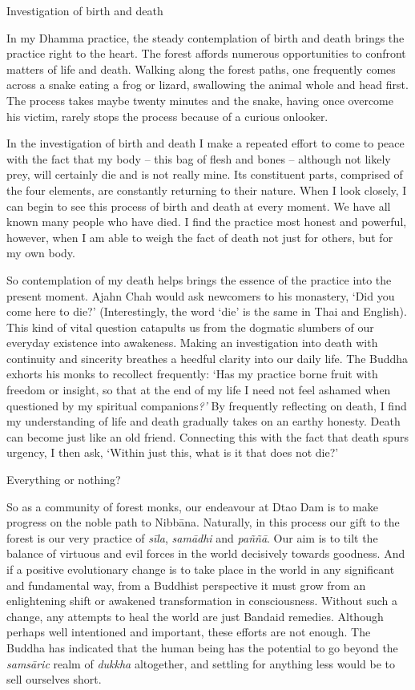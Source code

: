 Investigation of birth and death

In my Dhamma practice, the steady contemplation of birth and death
brings the practice right to the heart. The forest affords numerous
opportunities to confront matters of life and death. Walking along the
forest paths, one frequently comes across a snake eating a frog or
lizard, swallowing the animal whole and head first. The process takes
maybe twenty minutes and the snake, having once overcome his victim,
rarely stops the process because of a curious onlooker.

In the investigation of birth and death I make a repeated effort to come
to peace with the fact that my body -- this bag of flesh and bones --
although not likely prey, will certainly die and is not really mine. Its
constituent parts, comprised of the four elements, are constantly
returning to their nature. When I look closely, I can begin to see this
process of birth and death at every moment. We have all known many
people who have died. I find the practice most honest and powerful,
however, when I am able to weigh the fact of death not just for others,
but for my own body.

So contemplation of my death helps brings the essence of the practice
into the present moment. Ajahn Chah would ask newcomers to his
monastery, `Did you come here to die?' (Interestingly, the word `die' is
the same in Thai and English). This kind of vital question catapults us
from the dogmatic slumbers of our everyday existence into awakeness.
Making an investigation into death with continuity and sincerity
breathes a heedful clarity into our daily life. The Buddha exhorts his
monks to recollect frequently: `Has my practice borne fruit with freedom
or insight, so that at the end of my life I need not feel ashamed when
questioned by my spiritual companions\emph{?'} By frequently reflecting
on death, I find my understanding of life and death gradually takes on
an earthy honesty. Death can become just like an old friend. Connecting
this with the fact that death spurs urgency, I then ask, `Within just
this, what is it that does not die?'

Everything or nothing?

So as a community of forest monks, our endeavour at Dtao Dam is to make
progress on the noble path to Nibbāna. Naturally, in this process our
gift to the forest is our very practice of \emph{sīla}, \emph{samādhi}
and \emph{paññā}. Our aim is to tilt the balance of virtuous and evil
forces in the world decisively towards goodness. And if a positive
evolutionary change is to take place in the world in any significant and
fundamental way, from a Buddhist perspective it must grow from an
enlightening shift or awakened transformation in consciousness. Without
such a change, any attempts to heal the world are just Bandaid remedies.
Although perhaps well intentioned and important, these efforts are not
enough. The Buddha has indicated that the human being has the potential
to go beyond the \emph{samsāric} realm of \emph{dukkha} altogether, and
settling for anything less would be to sell ourselves short.


